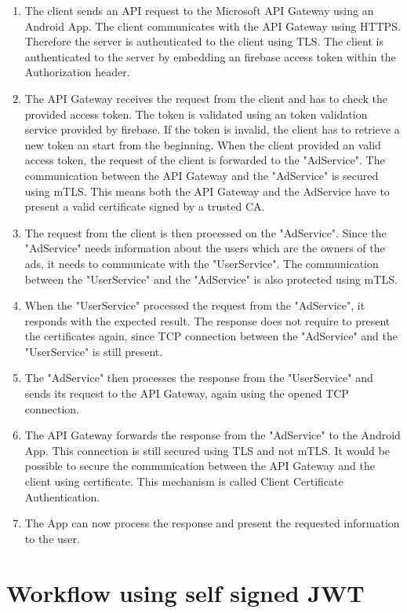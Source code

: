 \begin{enumerate}
	\item The client sends an API request to the Microsoft API Gateway using an Android App.
		The client communicates with the API Gateway using HTTPS.
		Therefore the server is authenticated to the client using TLS.
		The client is authenticated to the server by embedding an firebase access token within the Authorization header.
	\item The API Gateway receives the request from the client and has to check the provided access token.
		The token is validated using an token validation service provided by firebase.
		If the token is invalid, the client has to retrieve a new token an start from the beginning.
		When the client provided an valid access token, the request of the client is forwarded to the "AdService".
		The communication between the API Gateway and the "AdService" is secured using mTLS.
		This means both the API Gateway and the AdService have to present a valid certificate signed by a trusted CA.
	\item The request from the client is then processed on the "AdService".
		Since the "AdService" needs information about the users which are the owners of the ads, it needs to communicate with the "UserService".
		The communication between the "UserService" and the "AdService" is also protected using mTLS.
	\item When the "UserService" processed the request from the "AdService", it responds with the expected result.
		The response does not require to present the certificates again, since TCP connection between the "AdService" and the "UserService" is still present.
	\item The "AdService" then processes the response from the "UserService" and sends its request to the API Gateway, again using the opened TCP connection.
	\item The API Gateway forwards the response from the "AdService" to the Android App.
		This connection is still secured using TLS and not mTLS.
		It would be possible to secure the communication between the API Gateway and the client using certificate.
		This mechanism is called Client Certificate Authentication.
	\item The App can now process the response and present the requested information to the user.
\end{enumerate}

\section{Workflow using self signed JWT}
